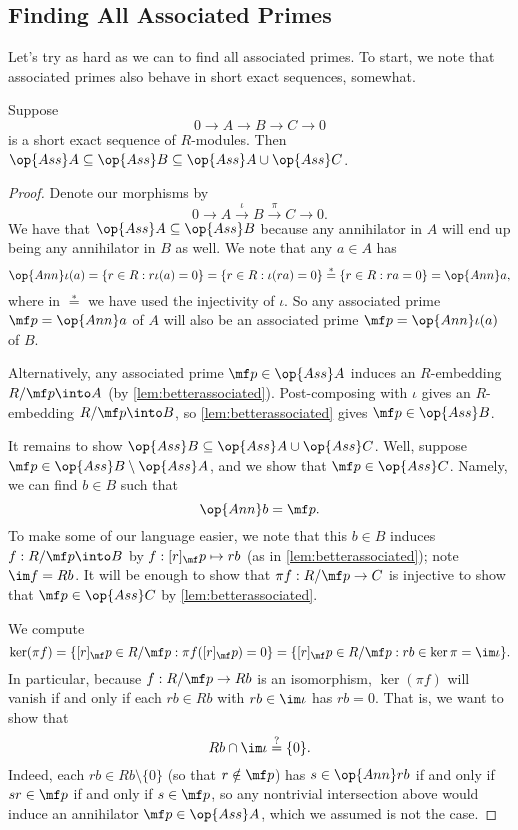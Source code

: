 \subsection{Finding All Associated Primes}
Let's try as hard as we can to find all associated primes. To start, we note that associated primes also behave in short exact sequences, somewhat.
\begin{lemma} \label{lem:assses}
	Suppose
	\[0\to A\to B\to C\to 0\]
	is a short exact sequence of $R$-modules. Then $\op{Ass}A\subseteq\op{Ass}B\subseteq\op{Ass}A\cup\op{Ass}C$.
\end{lemma}
\begin{proof}
	Denote our morphisms by
	\[0\to A\stackrel\iota\to B\stackrel\pi\to C\to 0.\]
	We have that $\op{Ass}A\subseteq\op{Ass}B$ because any annihilator in $A$ will end up being any annihilator in $B$ as well. We note that any $a\in A$ has
	\[\op{Ann}\iota(a)=\{r\in R:r\iota(a)=0\}=\{r\in R:\iota(ra)=0\}\stackrel*=\{r\in R:ra=0\}=\op{Ann}a,\]
	where in $\stackrel*=$ we have used the injectivity of $\iota$. So any associated prime $\mf p=\op{Ann}a$ of $A$ will also be an associated prime $\mf p=\op{Ann}\iota(a)$ of $B$.
	\begin{remark}[Nir]
		Alternatively, any associated prime $\mf p\in\op{Ass}A$ induces an $R$-embedding $R/\mf p\into A$ (by \autoref{lem:betterassociated}). Post-composing with $\iota$ gives an $R$-embedding $R/\mf p\into B$, so \autoref{lem:betterassociated} gives $\mf p\in\op{Ass}B$.
	\end{remark}

	It remains to show $\op{Ass}B\subseteq\op{Ass}A\cup\op{Ass}C$. Well, suppose $\mf p\in\op{Ass}B\setminus\op{Ass}A$, and we show that $\mf p\in\op{Ass}C$. Namely, we can find $b\in B$ such that
	\[\op{Ann}b=\mf p.\]
	To make some of our language easier, we note that this $b\in B$ induces $f:R/\mf p\into B$ by $f:[r]_\mf p\mapsto rb$ (as in \autoref{lem:betterassociated}); note $\im f=Rb$. It will be enough to show that $\pi f:R/\mf p\to C$ is injective to show that $\mf p\in\op{Ass}C$ by \autoref{lem:betterassociated}.
	
	We compute
	\[\ker(\pi f)=\{[r]_\mf p\in R/\mf p:\pi f([r]_\mf p)=0\}=\{[r]_\mf p\in R/\mf p:rb\in\ker\pi=\im\iota\}.\]
	In particular, because $f:R/\mf p\to Rb$ is an isomorphism, $\ker(\pi f)$ will vanish if and only if each $rb\in Rb$ with $rb\in\im\iota$ has $rb=0$. That is, we want to show that
	\[Rb\cap\im\iota\stackrel?=\{0\}.\]
	Indeed, each $rb\in Rb\setminus\{0\}$ (so that $r\notin\mf p$) has $s\in\op{Ann}rb$ if and only if $sr\in\mf p$ if and only if $s\in\mf p$, so any nontrivial intersection above would induce an annihilator $\mf p\in\op{Ass}A$, which we assumed is not the case.
\end{proof}
